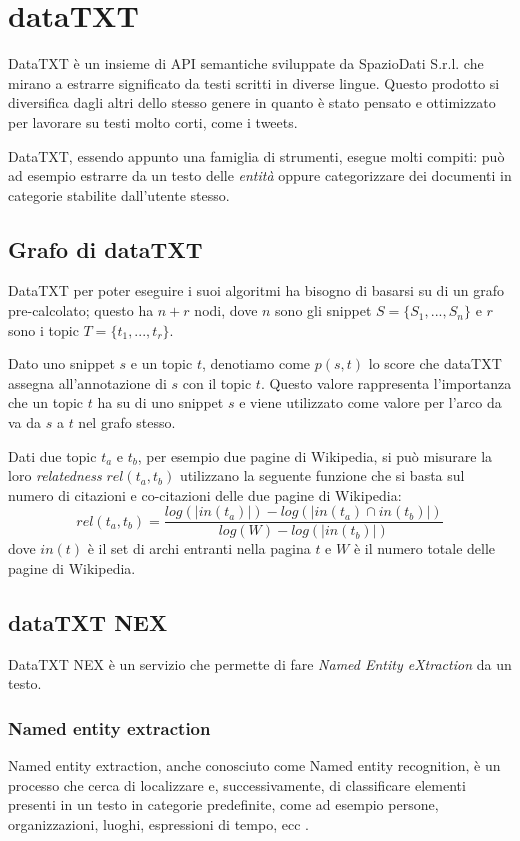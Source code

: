 \section{dataTXT}
DataTXT è un insieme di API semantiche sviluppate da SpazioDati S.r.l. che mirano a estrarre significato da testi scritti in diverse lingue. Questo prodotto si diversifica dagli altri dello stesso genere in quanto è stato pensato e ottimizzato per lavorare su testi molto corti, come i tweets.

DataTXT, essendo appunto una famiglia di strumenti, esegue molti compiti: può ad esempio estrarre da un testo delle \emph{entità} oppure categorizzare dei documenti in categorie stabilite dall'utente stesso.

\subsection{Grafo di dataTXT}
	DataTXT per poter eseguire i suoi algoritmi ha bisogno di basarsi su di un grafo pre-calcolato; questo ha $n+r$ nodi, dove $n$ sono gli snippet $S =  \{S_1, ..., S_n\}$ e $r$ sono i topic $T = \{t_1, ..., t_r\}$. 

Dato uno snippet $s$ e un topic $t$, denotiamo come $p(s,t)$ lo score che dataTXT assegna all'annotazione di $s$ con il topic $t$. Questo valore rappresenta l'importanza che un topic $t$ ha su di uno snippet $s$ e viene utilizzato come valore per l'arco da va da $s$ a $t$ nel grafo stesso.

	Dati due topic $t_a$ e $t_b$, per esempio due pagine di Wikipedia, si può misurare la loro \emph{relatedness} $rel(t_a, t_b)$ utilizzano la seguente funzione che si basta sul numero di citazioni e co-citazioni delle due pagine di Wikipedia:
	\begin{equation*}
	  rel(t_a, t_b) = \frac{log(| in(t_a) |) - log(| in(t_a) \cap in(t_b)|)}{log(W) - log(|in(t_b)|)}
	\end{equation*}
	dove $in(t)$ è il set di archi entranti nella pagina $t$ e $W$ è il numero totale delle pagine di Wikipedia\cite{datatxt_graph}.

\subsection{dataTXT NEX}
	DataTXT NEX è un servizio che permette di fare \emph{Named Entity eXtraction} da un 	testo. 

	\subsubsection{Named entity extraction}
		Named entity extraction, anche conosciuto come Named entity recognition, è un processo che cerca di localizzare e, successivamente, di classificare elementi presenti in un testo in categorie predefinite, come ad esempio persone, organizzazioni, luoghi, espressioni di tempo, ecc \cite{named_enitity_extraction}.

